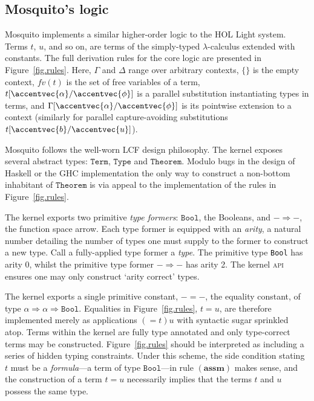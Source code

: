 \documentclass{llncs}
\let\vec\accentvec
\newcommand{\mosquito}{Mosquito\xspace}
\newcommand{\rulefont}[1]{\ensuremath{(\mathbf{#1})}}
\begin{document}
\subsection*{\mosquito's logic}
\label{sect.logic}
\mosquito implements a similar higher-order logic to the HOL Light system.
Terms $t$, $u$, and so on, are terms of the simply-typed $\lambda$-calculus extended with constants.
The full derivation rules for the core logic are presented in Figure~\ref{fig.rules}.
Here, $\Gamma$ and $\Delta$ range over arbitrary contexts, $\{\}$ is the empty context, $fv(t)$ is the set of free variables of a term, $t[\vec{\alpha}/\vec{\phi}]$ is a parallel substitution instantiating types in terms, and $\Gamma[\vec{\alpha}/\vec{\phi}]$ is its pointwise extension to a context (similarly for parallel capture-avoiding substitutions $t[\vec{b}/\vec{u}]$).

\mosquito follows the well-worn LCF design philosophy.
The kernel exposes several abstract types: $\mathtt{Term}$, $\mathtt{Type}$ and $\mathtt{Theorem}$.
Modulo bugs in the design of Haskell or the GHC implementation the only way to construct a non-bottom inhabitant of $\mathtt{Theorem}$ is via appeal to the implementation of the rules in Figure~\ref{fig.rules}.

The kernel exports two primitive \emph{type formers}: $\mathtt{Bool}$, the Booleans, and $- \Rightarrow -$, the function space arrow.
Each type former is equipped with an \emph{arity}, a natural number detailing the number of types one must supply to the former to construct a new type.
Call a fully-applied type former a \emph{type}.
The primitive type \texttt{Bool} has arity 0, whilst the primitive type former $- \Rightarrow -$ has arity 2.
The kernel \textsc{api} ensures one may only construct `arity correct' types.

The kernel exports a single primitive constant, $- = -$, the equality constant, of type $\alpha \Rightarrow \alpha \Rightarrow \mathtt{Bool}$.
Equalities in Figure~\ref{fig.rules}, $t = u$, are therefore implemented merely as applications $(= t) u$ with syntactic sugar sprinkled atop.
Terms within the kernel are fully type annotated and only type-correct terms may be constructed.
Figure~\ref{fig.rules} should be interpreted as including a series of hidden typing constraints.
Under this scheme, the side condition stating $t$ must be a \emph{formula}---a term of type $\mathtt{Bool}$---in rule \rulefont{assm} makes sense, and the construction of a term $t = u$ necessarily implies that the terms $t$ and $u$ possess the same type.
\end{document}
